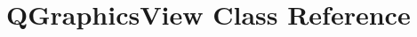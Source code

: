 \hypertarget{classQGraphicsView}{}\section{Q\+Graphics\+View Class Reference}
\label{classQGraphicsView}
